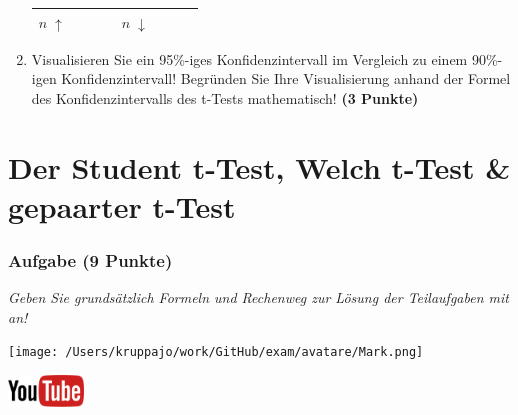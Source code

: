 \documentclass[a4paper, 9pt]{scrartcl}\usepackage[]{graphicx}\usepackage[]{xcolor}
\begin{document}
\begin{enumerate}
\begin{center}
\begin{tabular}[c]{l|c|c|c|l|c|c|c}
    \hline
        \textbf{$n\; \uparrow$} & \hspace{1.8cm} & \hspace{1.8cm}  & \hspace{1.8cm} & \textbf{
                                                          $n\; \downarrow$} &
                                                                          \hspace{1.8cm}
                                                & \hspace{1.8cm}  & \hspace{1.8cm}\strut\\
    \hline
  \end{tabular}
\end{center}
\item Visualisieren Sie ein 95\%-iges Konfidenzintervall im Vergleich
  zu einem 90\%-igen Konfidenzintervall! Begr{\"u}nden Sie Ihre Visualisierung anhand der Formel
  des Konfidenzintervalls des t-Tests mathematisch! \textbf{(3 Punkte)} 
\end{enumerate} 
\clearpage
\part{Der Student t-Test, Welch t-Test \& gepaarter t-Test}

\section{Aufgabe \hfill (9 Punkte)}

\textit{Geben Sie grundsätzlich Formeln und Rechenweg zur Lösung der Teilaufgaben mit an!} \\[1Ex]
 

 
\begin{minipage}[t]{0.5\textwidth}
\texttt{[image: /Users/kruppajo/work/GitHub/exam/avatare/Mark.png]}
\end{minipage}
\begin{minipage}[t]{0.5\textwidth}
\hfill
\href{https://youtu.be/eejS2uG4o-M}{\includegraphics[width = 2cm]{img/youtube}}\\[1Ex]
\end{minipage}
\vspace{1ex}
\end{document}
